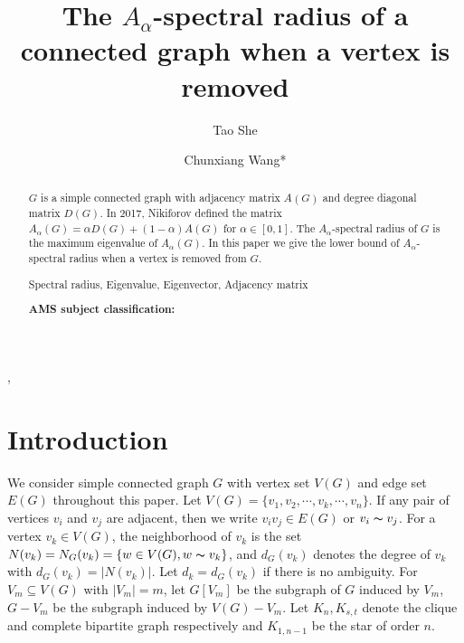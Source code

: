 \documentclass[amsthm]{elsart}
\begin{document}
\begin{frontmatter}
\title{The $A_{\alpha}$-spectral radius of a connected graph when a vertex is removed }

\journal{~~}

\author[CW]{Tao She},
\author[CW]{Chunxiang Wang*}

\address[CW]{ School of Mathematics and Statistics, Central China Normal University, Wuhan,  P.R. China}





\begin{abstract}
$G$ is a simple connected graph with adjacency matrix $A(G)$ and degree diagonal matrix $D(G)$.
 In 2017, Nikiforov  \cite{2016Merging} defined the matrix $A_{\alpha}(G) = \alpha D(G) + (1- \alpha)A(G)$ for $\alpha \in [0, 1].$
The $A_\alpha$-spectral radius of $G$ is the maximum eigenvalue of $A_\alpha(G)$.
In this paper we give the lower bound of $A_\alpha$-spectral radius when a vertex is removed from $G$.

\vskip 2mm   Spectral radius,  Eigenvalue,  Eigenvector,  Adjacency matrix

{\bf AMS subject classification:}


\end{abstract}


\end{frontmatter}

\section{Introduction}

\qquad  We consider simple connected graph $G$ with vertex set $V(G)$ and edge set $E(G)$  throughout this paper.   Let $V(G)=\{v_1, v_2, \cdots, v_k, \cdots, v_n\}$. If any pair of vertices $v_i$ and $v_j$ are adjacent, then we write $v_iv_j \in E(G)$ or $v_i \thicksim v_j$. For a vertex $v_k \in V(G)$, the neighborhood of  $v_k $ is the set $N(v_k) = N_G(v_k) = \{w \in V(G), w  \thicksim  v_k   \}$, and $d_G(v_k)$  denotes the degree of $v_k$ with $ d_{G}(v_k) = |N(v_k)|$.  Let $d_k=d_G(v_k)$  if there
is no ambiguity. For $V_m \subseteq V(G)$ with $|V_m|=m$,   let $G[V_m]$ be the subgraph of $G$ induced by $V_m$, $G - V_m$ be the subgraph induced by $V(G) - V_m$. Let $K_n, K_{s,t}$   denote the clique and complete bipartite graph respectively and  $K_{1,n-1}$ be the star of order $n$.
\end{document}

